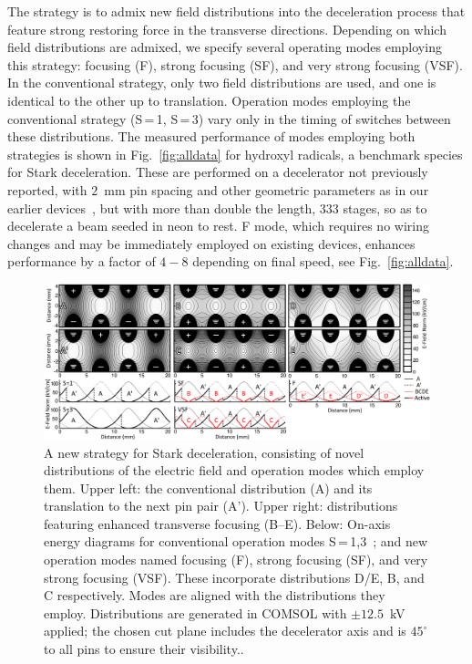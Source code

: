 \documentclass[%
 reprint,
 amsmath,amssymb,
 aps,
prl,
]{revtex4-1}
\begin{document}
The strategy is to admix new field distributions into the deceleration process that feature strong restoring force in the transverse directions.
Depending on which field distributions are admixed, we specify several operating modes employing this strategy: focusing (F), strong focusing (SF), and very strong focusing (VSF).
In the conventional strategy, only two field distributions are used, and one is identical to the other up to translation.
Operation modes employing the conventional strategy (S\,=\,1, S\,=\,3) vary only in the timing of switches between these distributions.
The measured performance of modes employing both strategies is shown in Fig.~\ref{fig:alldata} for hydroxyl radicals, a benchmark species for Stark deceleration.
These are performed on a decelerator not previously reported, with $2$~mm pin spacing and other geometric parameters as in our earlier devices~\cite{Bochinski2004,Sawyer2007}, but with more than double the length, $333$ stages, so as to decelerate a beam seeded in neon to rest.
F mode, which requires no wiring changes and may be immediately employed on existing devices, enhances performance by a factor of $4-8$ depending on final speed, see Fig.~\ref{fig:alldata}.
\begin{figure}[t!]
\includegraphics[width=\linewidth]{Configurations/pinpairformal6.png}%
\caption{
A new strategy for Stark deceleration, consisting of novel distributions of the electric field and operation modes which employ them. 
Upper left: the conventional distribution (A) and its translation to the next pin pair (A'). 
Upper right: distributions featuring enhanced transverse focusing (B--E). 
Below: On-axis energy diagrams for conventional operation modes S\,=\,1,3~\cite{VanDeMeerakker2005a}; and new operation modes named focusing (F), strong focusing (SF), and very strong focusing (VSF). 
These incorporate distributions D/E, B, and C respectively.  
Modes are aligned with the distributions they employ. 
Distributions are generated in COMSOL with $\pm12.5$~kV applied; the chosen cut plane includes the decelerator axis and is $45^\circ$ to all pins to ensure their visibility.\vspace{-4mm}. 
}
\label{fig:chargecartoon}
\end{figure}
\end{document}
